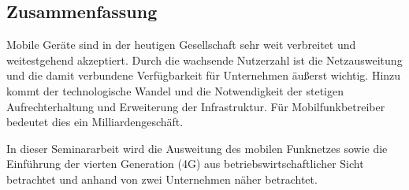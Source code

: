 \subsection*{Zusammenfassung}
\pagestyle{empty}

Mobile Geräte sind in der heutigen Gesellschaft sehr weit verbreitet und weitestgehend akzeptiert. Durch die wachsende Nutzerzahl ist die Netzausweitung und die damit verbundene Verfügbarkeit für Unternehmen äußerst wichtig. Hinzu kommt der technologische Wandel und die Notwendigkeit der stetigen Aufrechterhaltung und Erweiterung der Infrastruktur. Für Mobilfunkbetreiber bedeutet dies ein Milliardengeschäft.

In dieser Seminararbeit wird die Ausweitung des mobilen Funknetzes sowie die Einführung der vierten Generation (4G) aus betriebswirtschaftlicher Sicht betrachtet und anhand von zwei Unternehmen näher betrachtet. 
